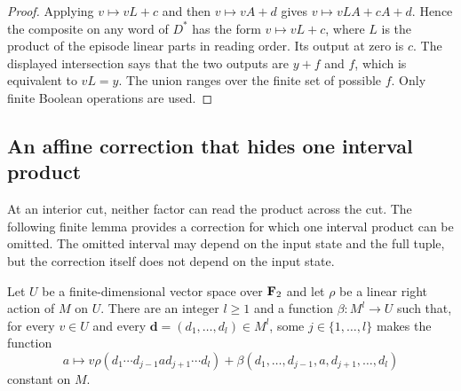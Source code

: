 \begin{proof}
Applying $v\mapsto vL+c$ and then $v\mapsto vA+d$ gives
$v\mapsto vLA+cA+d$. Hence the composite on any word of $D^*$ has
the form $v\mapsto vL+c$, where $L$ is the product of the episode
linear parts in reading order. Its output at zero is $c$.
The displayed intersection says that the two outputs are $y+f$ and
$f$, which is equivalent to $vL=y$. The union ranges over the finite
set of possible $f$. Only finite Boolean operations are used.
\end{proof}

\subsection{An affine correction that hides one interval product}

At an interior cut, neither factor can read the product across the
cut. The following finite lemma provides a correction for which one
interval product can be omitted. The omitted interval may depend on
the input state and the full tuple, but the correction itself does
not depend on the input state.

\begin{lemma}\label{lem:affine-line}
Let $U$ be a finite-dimensional vector space over $\mathbf F_2$ and let
$\rho$ be a linear right action of $M$ on $U$. There are an integer
$l\ge1$ and a function $\beta:M^l\to U$ such that, for every
$v\in U$ and every $\mathbf d=(d_1,\ldots,d_l)\in M^l$, some
$j\in\{1,\ldots,l\}$ makes the function
\[
 a\longmapsto
 v\rho(d_1\cdots d_{j-1}a d_{j+1}\cdots d_l)
 +\beta(d_1,\ldots,d_{j-1},a,d_{j+1},\ldots,d_l)
\]
constant on $M$.
\end{lemma}

